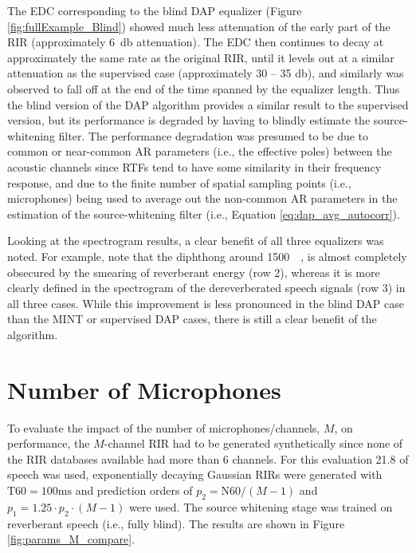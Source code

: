 The EDC corresponding to the blind DAP equalizer (Figure \ref{fig:fullExample_Blind}) showed much less attenuation of the early part of the RIR (approximately \qty{6}{\decibel} attenuation). The EDC then continues to decay at approximately the same rate as the original RIR, until it levels out at a similar attenuation as the supervised case (approximately 30 -- 35 \unit{\decibel}), and similarly was observed to fall off at the end of the time spanned by the equalizer length. Thus the blind version of the DAP algorithm provides a similar result to the supervised version, but its performance is degraded by having to blindly estimate the source-whitening filter. The performance degradation was presumed to be due to common or near-common AR parameters (i.e., the effective poles) between the acoustic channels since RTFs tend to have some similarity in their frequency response, and due to the finite number of spatial sampling points (i.e., microphones) being used to average out the non-common AR parameters in the estimation of the source-whitening filter (i.e., Equation \ref{eq:dap_avg_autocorr}).

Looking at the spectrogram results, a clear benefit of all three equalizers was noted. For example, note that the diphthong around \qty{1500}{\milli\sec}, is almost completely obsecured by the smearing of reverberant energy (row 2), whereas it is more clearly defined in the spectrogram of the dereverberated speech signals (row 3) in all three cases. While this improvement is less pronounced in the blind DAP case than the MINT or supervised DAP cases, there is still a clear benefit of the algorithm.

\section{Number of Microphones}

To evaluate the impact of the number of microphones/channels, $M$, on performance, the $M$-channel RIR had to be generated synthetically since none of the RIR databases available had more than 6 channels. For this evaluation \qty{21.8}{\sec} of speech was used, exponentially decaying Gaussian RIRs were generated with $\mathrm{T60} = 100 \unit{\milli\second}$ and prediction orders of $p_2 = \mathrm{N60} / \left(M-1\right)$ and $p_1 = 1.25 \cdot p_2 \cdot \left(M-1\right)$ were used. The source whitening stage was trained on reverberant speech (i.e., fully blind). The results are shown in Figure \ref{fig:params_M_compare}.


